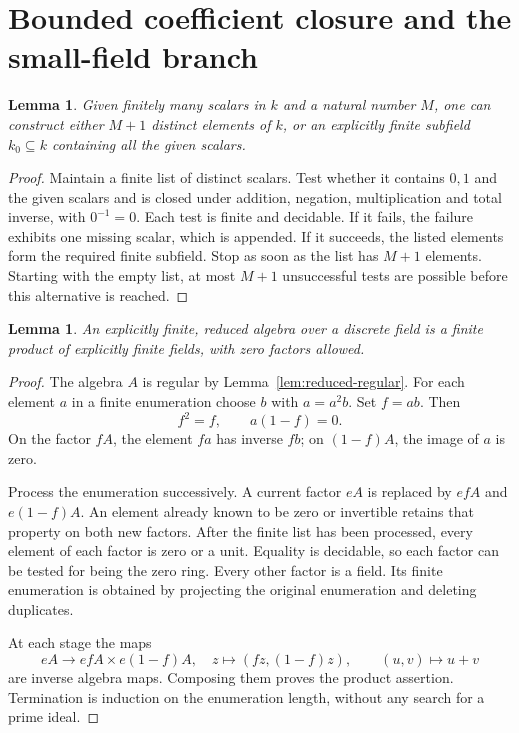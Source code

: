 \documentclass[11pt]{article}
\newtheorem{lemma}[theorem]{Lemma}
\theoremstyle{definition}
\theoremstyle{remark}
\begin{document}
\section{Bounded coefficient closure and the small-field branch}

\begin{lemma}\label{lem:closure}
Given finitely many scalars in $k$ and a natural number $M$, one can
construct either $M+1$ distinct elements of $k$, or an explicitly
finite subfield $k_0\subseteq k$ containing all the given scalars.
\end{lemma}
\begin{proof}
Maintain a finite list of distinct scalars. Test whether it contains
$0,1$ and the given scalars and is closed under addition, negation,
multiplication and total inverse, with $0^{-1}=0$.
Each test is finite and decidable. If it fails, the failure exhibits
one missing scalar, which is appended. If it succeeds, the listed
elements form the required finite subfield. Stop as soon as the list
has $M+1$ elements. Starting with the empty list, at most $M+1$
unsuccessful tests are possible before this alternative is reached.
\end{proof}

\begin{lemma}\label{lem:finite-regular-splitting}
An explicitly finite, reduced algebra over a discrete field is a
finite product of explicitly finite fields, with zero factors allowed.
\end{lemma}
\begin{proof}
The algebra $A$ is regular by Lemma~\ref{lem:reduced-regular}.
For each element $a$ in a finite enumeration choose $b$ with
$a=a^2b$. Set $f=ab$. Then
\[
 f^2=f,\qquad a(1-f)=0.
\]
On the factor $fA$, the element $fa$ has inverse $fb$; on
$(1-f)A$, the image of $a$ is zero.

Process the enumeration successively. A current factor $eA$ is
replaced by $efA$ and $e(1-f)A$. An element already known to be zero
or invertible retains that property on both new factors.
After the finite list has been processed, every element of each
factor is zero or a unit. Equality is decidable, so each factor can
be tested for being the zero ring. Every other factor is a field.
Its finite enumeration is obtained by projecting the original
enumeration and deleting duplicates.

At each stage the maps
\[
 eA\longrightarrow efA\times e(1-f)A,
 \quad z\longmapsto(fz,(1-f)z),
 \qquad (u,v)\longmapsto u+v
\]
are inverse algebra maps. Composing them proves the product assertion.
Termination is induction on the enumeration length, without any
search for a prime ideal.
\end{proof}
\end{document}
